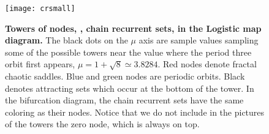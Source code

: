 \begin{figure}
 \centering
 \texttt{[image: crsmall]}
 \caption{{\bf Towers of nodes, \ie, chain recurrent sets, in the Logistic map diagram.}
 \allblue
 The black dots on the $\mu$ axis are sample values sampling some of the possible towers near the value where the period three orbit first appears, $\mu = 1+\sqrt 8\simeq3.8284$.
Red nodes denote fractal chaotic saddles. Blue and green nodes are periodic orbits. Black denotes attracting sets which occur at the bottom of the tower. 
In the bifurcation diagram, the chain recurrent sets have the same coloring as their nodes. Notice that we do not include in the pictures of the towers the zero node, which is always on top.}
 \label{fig:p3}
\end{figure} 

